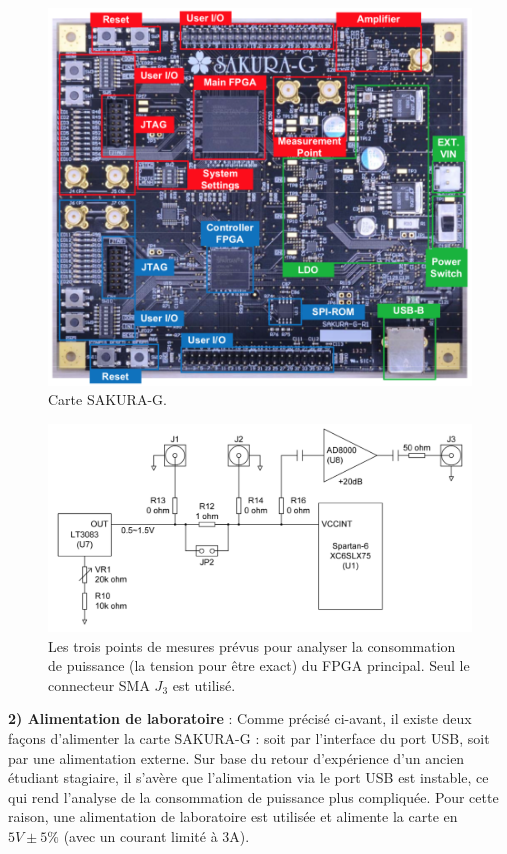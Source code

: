 \documentclass[oneside]{book}
\begin{document}
\newpage

\begin{figure}[htbp]
    \centering
    \includegraphics[scale=0.69]{image/Sakura}
    \caption{Carte SAKURA-G.}
    \label{fig:sakura} 
\end{figure}

\begin{figure}[htbp]
    \centering
    \includegraphics[scale=0.62]{image/points_mesures}
    \caption{Les trois points de mesures prévus pour analyser la consommation de puissance (la tension pour être exact) du FPGA principal. Seul le connecteur SMA $J_3$ est utilisé.}
    \label{fig:mesurePoints} 
\end{figure}

\hspace{-0.5cm}\textbf{2) Alimentation de laboratoire} : Comme précisé ci-avant, il existe deux façons d'alimenter la carte SAKURA-G : soit par l'interface du port USB, soit par une alimentation externe. Sur base du retour d'expérience d'un ancien étudiant stagiaire, il s'avère que l'alimentation via le port USB est instable, ce qui rend l'analyse de la consommation de puissance plus compliquée. Pour cette raison, une alimentation de laboratoire est utilisée et alimente la carte en $5V\pm 5\%$ (avec un courant limité à 3A).  
\end{document}
